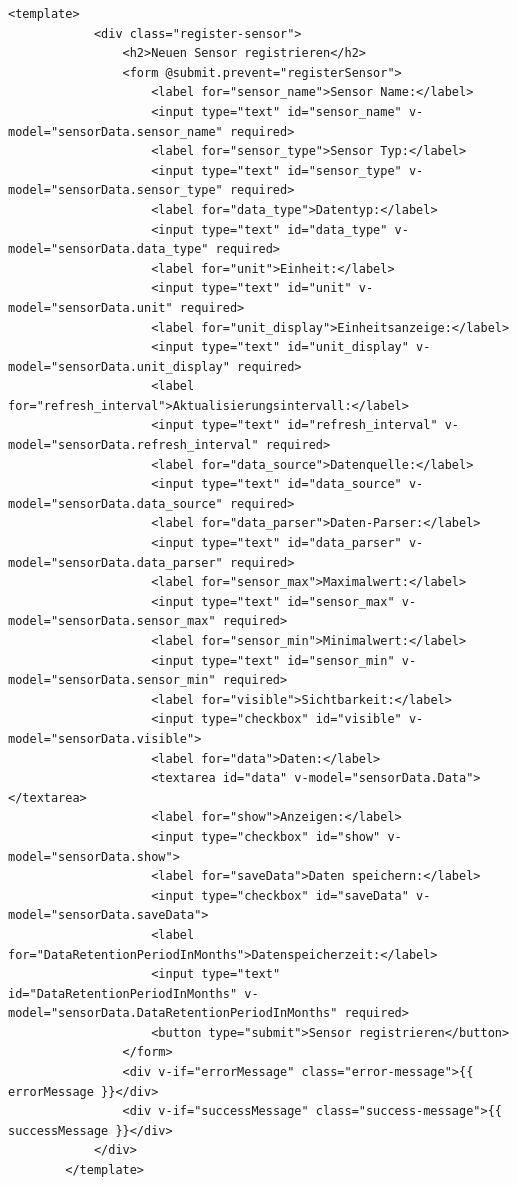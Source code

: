 \clearpage


	\begin{lstlisting}[caption={registerSensor (Frontend)}, style=js]
		<template>
			<div class="register-sensor">
				<h2>Neuen Sensor registrieren</h2>
				<form @submit.prevent="registerSensor">
					<label for="sensor_name">Sensor Name:</label>
					<input type="text" id="sensor_name" v-model="sensorData.sensor_name" required>
					<label for="sensor_type">Sensor Typ:</label>
					<input type="text" id="sensor_type" v-model="sensorData.sensor_type" required>
					<label for="data_type">Datentyp:</label>
					<input type="text" id="data_type" v-model="sensorData.data_type" required>
					<label for="unit">Einheit:</label>
					<input type="text" id="unit" v-model="sensorData.unit" required>
					<label for="unit_display">Einheitsanzeige:</label>
					<input type="text" id="unit_display" v-model="sensorData.unit_display" required>
					<label for="refresh_interval">Aktualisierungsintervall:</label>
					<input type="text" id="refresh_interval" v-model="sensorData.refresh_interval" required>
					<label for="data_source">Datenquelle:</label>
					<input type="text" id="data_source" v-model="sensorData.data_source" required>
					<label for="data_parser">Daten-Parser:</label>
					<input type="text" id="data_parser" v-model="sensorData.data_parser" required>
					<label for="sensor_max">Maximalwert:</label>
					<input type="text" id="sensor_max" v-model="sensorData.sensor_max" required>
					<label for="sensor_min">Minimalwert:</label>
					<input type="text" id="sensor_min" v-model="sensorData.sensor_min" required>
					<label for="visible">Sichtbarkeit:</label>
					<input type="checkbox" id="visible" v-model="sensorData.visible">
					<label for="data">Daten:</label>
					<textarea id="data" v-model="sensorData.Data"></textarea>
					<label for="show">Anzeigen:</label>
					<input type="checkbox" id="show" v-model="sensorData.show">
					<label for="saveData">Daten speichern:</label>
					<input type="checkbox" id="saveData" v-model="sensorData.saveData">
					<label for="DataRetentionPeriodInMonths">Datenspeicherzeit:</label>
					<input type="text" id="DataRetentionPeriodInMonths" v-model="sensorData.DataRetentionPeriodInMonths" required>
					<button type="submit">Sensor registrieren</button>
				</form>
				<div v-if="errorMessage" class="error-message">{{ errorMessage }}</div>
				<div v-if="successMessage" class="success-message">{{ successMessage }}</div>
			</div>
		</template>


\end{lstlisting}

